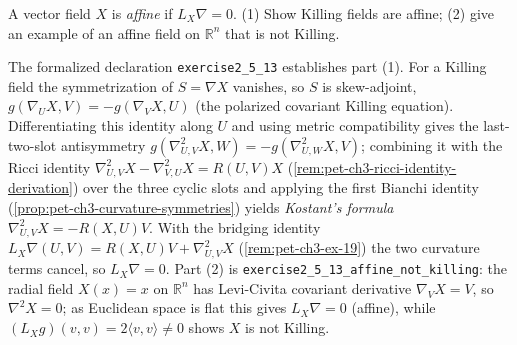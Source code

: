 \begin{remark}
  \label{rem:pet-ch2-ex-13}
  \leanok
  A vector field $X$ is \emph{affine} if $L_X\nabla=0$. (1) Show Killing
  fields are affine; (2) give an example of an affine field on $\mathbb{R}^n$ that
  is not Killing.

  The formalized declaration \texttt{exercise2\_5\_13} establishes part (1). For a
  Killing field the symmetrization of $S=\nabla X$ vanishes, so $S$ is
  skew-adjoint, $g(\nabla_UX,V)=-g(\nabla_VX,U)$ (the polarized covariant Killing
  equation). Differentiating this identity along $U$ and using metric
  compatibility gives the last-two-slot antisymmetry
  $g(\nabla^2_{U,V}X,W)=-g(\nabla^2_{U,W}X,V)$; combining it with the Ricci
  identity $\nabla^2_{U,V}X-\nabla^2_{V,U}X=R(U,V)X$
  (\cref{rem:pet-ch3-ricci-identity-derivation}) over the three cyclic slots and
  applying the first Bianchi identity (\cref{prop:pet-ch3-curvature-symmetries})
  yields \emph{Kostant's formula} $\nabla^2_{U,V}X=-R(X,U)V$. With the bridging
  identity $L_X\nabla(U,V)=R(X,U)V+\nabla^2_{U,V}X$ (\cref{rem:pet-ch3-ex-19}) the
  two curvature terms cancel, so $L_X\nabla=0$. Part (2) is
  \texttt{exercise2\_5\_13\_affine\_not\_killing}: the radial field $X(x)=x$ on
  $\mathbb{R}^n$ has Levi-Civita covariant derivative $\nabla_VX=V$, so
  $\nabla^2X=0$; as Euclidean space is flat this gives $L_X\nabla=0$ (affine),
  while $(L_Xg)(v,v)=2\langle v,v\rangle\neq0$ shows $X$ is not Killing.
\end{remark}

